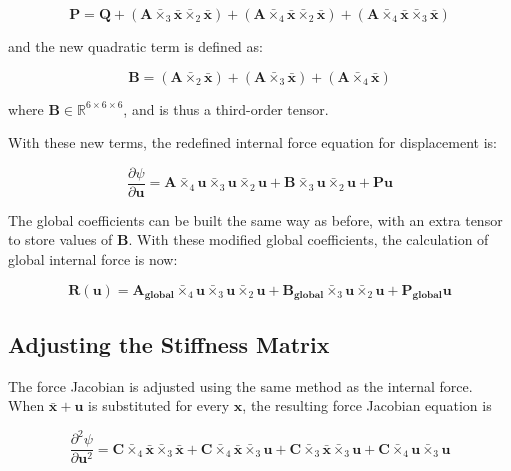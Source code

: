 \documentclass[twocolumn,10pt]{asme2ej}
\begin{document}
\begin{equation}
  \bm{P} = \bm{Q} + (\bm{A} \bar{\times}_3 \bm{\bar{x}} \bar{\times}_2 \bm{\bar{x}})
  + (\bm{A} \bar{\times}_4 \bm{\bar{x}} \bar{\times}_2 \bm{\bar{x}})
  + (\bm{A} \bar{\times}_4 \bm{\bar{x}} \bar{\times}_3 \bm{\bar{x}})
\end{equation}

\noindent and the new quadratic term is defined as:

\begin{equation}
  \bm{B} = (\bm{A} \bar{\times}_2 \bm{\bar{x}})
  + (\bm{A}\bar{\times}_3 \bm{\bar{x}})
  + (\bm{A} \bar{\times}_4 \bm{\bar{x}})
\end{equation}

\noindent where $\bm{B} \in \mathbb{R}^{6 \times 6 \times 6}$, and is thus a third-order tensor.

With these new terms, the redefined internal force equation for displacement is:

\begin{equation}
 \frac{\partial \psi}{\partial \bm{u}} = \bm{A} \bar{\times}_4 \bm{u} \bar{\times}_3 \bm{u} \bar{\times}_2 \bm{u}
 + \bm{B} \bar{\times}_3 \bm{u} \bar{\times}_2 \bm{u} + \bm{P}\bm{u}
\end{equation}

The global coefficients can be built the same way as before, with an extra tensor to store values of $\bm{B}$. With these modified global coefficients, the calculation of global internal force is now:

\begin{equation}
  \bm{R}(\bm{u}) = \bm{A_{global}} \bar{\times}_4 \bm{u} \bar{\times}_3 \bm{u} \bar{\times}_2 \bm{u}
  + \bm{B_{global}} \bar{\times}_3 \bm{u} \bar{\times}_2 \bm{u} + \bm{P_{global}}\bm{u}
  \label{eq_globalForce}
\end{equation}

\subsection{Adjusting the Stiffness Matrix}

The force Jacobian is adjusted using the same method as the internal force. When $\bm{\bar{x}} + \bm{u}$ is substituted for every $\bm{x}$, the resulting force Jacobian equation is

\begin{equation}
 \frac{\partial^2 \psi}{\partial \bm{u}^2} = \bm{C} \bar{\times}_4 \bm{\bar{x}} \bar{\times}_3 \bm{\bar{x}}
 + \bm{C} \bar{\times}_4 \bm{\bar{x}} \bar{\times}_3 \bm{u} + \bm{C} \bar{\times}_3 \bm{\bar{x}} \bar{\times}_3 \bm{u}
 + \bm{C} \bar{\times}_4 \bm{u} \bar{\times}_3 \bm{u}
\end{equation}
\end{document}
